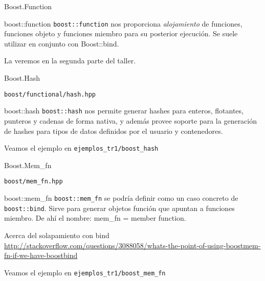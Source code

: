 \documentclass[8pt,xcolor=svgnames]{beamer}
\begin{document}

\begin{frame}{Boost.Function}
  \begin{block}{boost::function}
    \texttt{boost::function} nos proporciona \textit{alojamiento} de funciones,
    funciones objeto y funciones miembro para su posterior
    ejecución. Se suele utilizar en conjunto con Boost::bind.
  \end{block}

  \pause

  \begin{block}{}
    La veremos en la segunda parte del taller.
  \end{block}  
\end{frame}


\begin{frame}{Boost.Hash}
  \begin{block}{}
    \texttt{boost/functional/hash.hpp}
  \end{block}
  \begin{block}{boost::hash}
    \texttt{boost::hash} nos permite generar hashes para enteros, flotantes,
    punteros y cadenas de forma nativa, y además provee soporte para
    la generación de hashes para tipos de datos definidos por el
    usuario y contenedores.
  \end{block}
  \pause
  \begin{block}{}
    Veamos el ejemplo en \texttt{ejemplos\_tr1/boost\_hash}
  \end{block}
\end{frame}


\begin{frame}{Boost.Mem\_fn} 
  \begin{block}{}
    \texttt{boost/mem\_fn.hpp}
  \end{block}
  \begin{block}{boost::mem\_fn}
    \texttt{boost::mem\_fn} se podría definir como un caso concreto de
    \texttt{boost::bind}. Sirve para generar objetos función que
    apuntan a funciones miembro. De ahí el nombre: mem\_fn = member
    function.
  \end{block}
  \pause
  \begin{block}{Acerca del solapamiento con bind}
    \url{http://stackoverflow.com/questions/3088058/whats-the-point-of-using-boostmem-fn-if-we-have-boostbind}
  \end{block}
  \pause
  \begin{block}{}
    Veamos el ejemplo en \texttt{ejemplos\_tr1/boost\_mem\_fn}
  \end{block}  
\end{frame}
\end{document}
